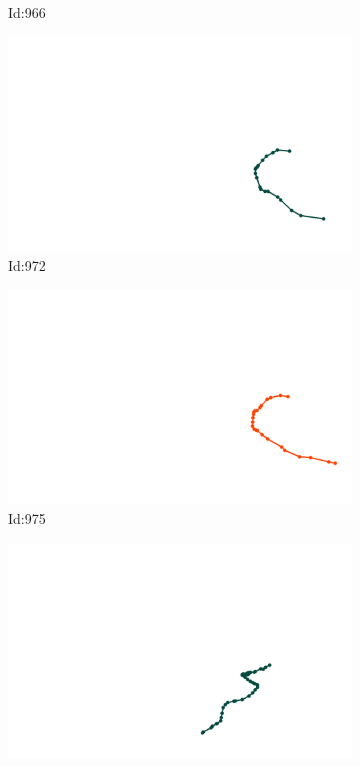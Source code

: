 \documentclass[12pt,twoside]{report}
\begin{document}
\begin{figure}
\begin{subfigure}[b]{0.20\textwidth}
\caption{Id:966}
\end{subfigure}
\begin{subfigure}[b]{0.20\textwidth}
\centering
\includegraphics[width=\textwidth]{../trajectories/972.png}
\caption{Id:972}
\end{subfigure}
\begin{subfigure}[b]{0.20\textwidth}
\centering
\includegraphics[width=\textwidth]{../trajectories/975.png}
\caption{Id:975}
\end{subfigure}
\begin{subfigure}[b]{0.20\textwidth}
\centering
\includegraphics[width=\textwidth]{../trajectories/979.png}

\end{subfigure}
\end{figure}
\end{document}
